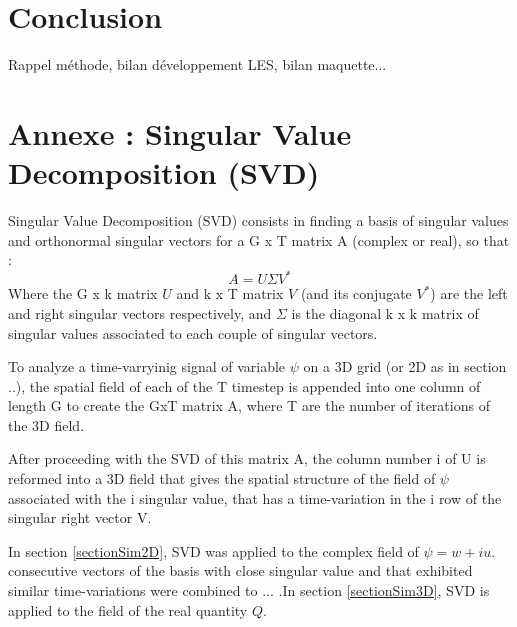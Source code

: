 \section{Conclusion}

\color{green} Rappel méthode, bilan développement LES, bilan maquette...\color{black}




\section{Annexe : Singular Value Decomposition (SVD)}
\label{annexeSVD}
Singular Value Decomposition (SVD) consists in finding a basis of singular values and orthonormal singular vectors for a G x T matrix A (complex or real), so that :
\begin{equation}
A = U \Sigma V^* 
\end{equation}
Where the G x k matrix $U$ and k x T matrix $V$ (and its conjugate $V^*$) are the left and right singular vectors respectively, and $\Sigma$ is the diagonal k x k matrix of singular values associated to each couple of singular vectors.

To analyze a time-varryinig signal of variable $\psi$ on a 3D grid (or 2D as in section ..), the spatial field of each of the T timestep is appended into one column of length G to create the GxT matrix A, where T are the number of iterations of the 3D field. 

After proceeding with the SVD of this matrix A, the column number i of U is reformed into a 3D field that gives the spatial structure of the field of $\psi$ associated with the i singular value, that has a time-variation in the i row of the singular right vector V.

In section \ref{sectionSim2D}, SVD was applied to the complex field of $\psi=w+iu$. consecutive vectors of the basis with close singular value and that exhibited similar time-variations were combined to ... .In section \ref{sectionSim3D}, SVD is applied to the field of the real quantity $Q$.
